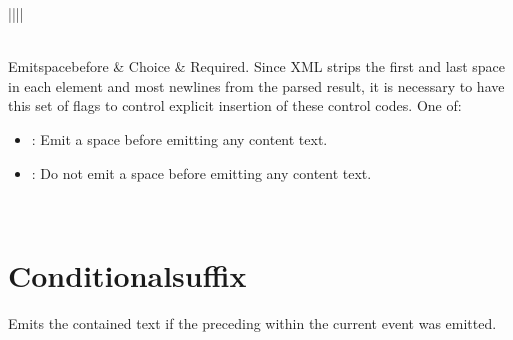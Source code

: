 \documentclass[letterpaper,12pt,english,openany,oneside]{sphinxmanual}
\begin{document}
\begin{savenotes}
\begin{tabular}[t]{||||}
\begin{itemize}
\end{itemize}
\\
\hline
Emit\sphinxhyphen{}space\sphinxhyphen{}before
&
Choice
&
Required. Since XML strips the first and last space in each element and most newlines from the parsed result, it is necessary to have this set of flags to control explicit insertion of these control codes. One of:
\begin{itemize}
\item {} 
: Emit a space before emitting any content text.

\item {} 
: Do not emit a space before emitting any content text.

\end{itemize}
\\
\hline
\end{tabular}
\par
\sphinxattableend\end{savenotes}


\section{Conditional\sphinxhyphen{}suffix}
\label{\detokenize{SaveAsXML_DirectivesRef:conditional-suffix}}
Emits the contained text if the preceding  within the current event was emitted.

\label{\detokenize{SaveAsXML_DirectivesRef:dtd-content-rule-5}}

\begin{sphinxVerbatim}[commandchars=\\\{\}]
\end{sphinxVerbatim}
\label{\detokenize{SaveAsXML_DirectivesRef:attributes-4}}
\end{document}
